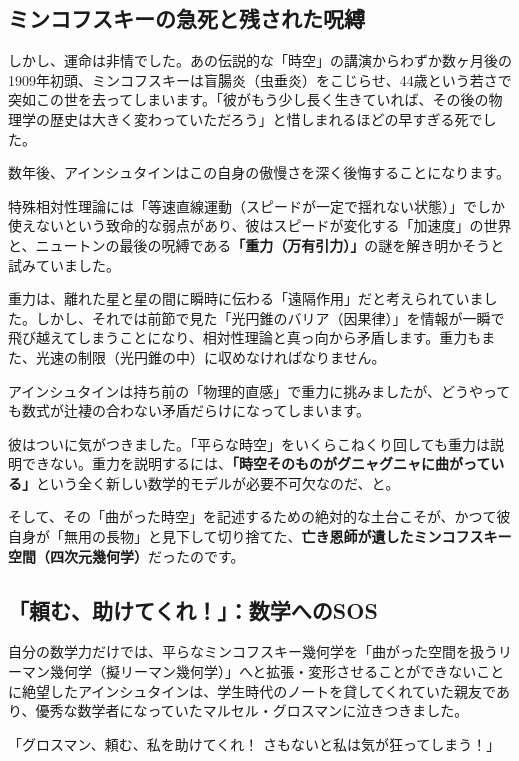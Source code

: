 \subsection{ミンコフスキーの急死と残された呪縛}

しかし、運命は非情でした。あの伝説的な「時空」の講演からわずか数ヶ月後の1909年初頭、ミンコフスキーは盲腸炎（虫垂炎）をこじらせ、44歳という若さで突如この世を去ってしまいます。「彼がもう少し長く生きていれば、その後の物理学の歴史は大きく変わっていただろう」と惜しまれるほどの早すぎる死でした。

数年後、アインシュタインはこの自身の傲慢さを深く後悔することになります。

特殊相対性理論には「等速直線運動（スピードが一定で揺れない状態）」でしか使えないという致命的な弱点があり、彼はスピードが変化する「加速度」の世界と、ニュートンの最後の呪縛である\textbf{「重力（万有引力）」}の謎を解き明かそうと試みていました。

重力は、離れた星と星の間に瞬時に伝わる「遠隔作用」だと考えられていました。しかし、それでは前節で見た「光円錐のバリア（因果律）」を情報が一瞬で飛び越えてしまうことになり、相対性理論と真っ向から矛盾します。重力もまた、光速の制限（光円錐の中）に収めなければなりません。

アインシュタインは持ち前の「物理的直感」で重力に挑みましたが、どうやっても数式が辻褄の合わない矛盾だらけになってしまいます。

彼はついに気がつきました。「平らな時空」をいくらこねくり回しても重力は説明できない。重力を説明するには、\textbf{「時空そのものがグニャグニャに曲がっている」}という全く新しい数学的モデルが必要不可欠なのだ、と。

そして、その「曲がった時空」を記述するための絶対的な土台こそが、かつて彼自身が「無用の長物」と見下して切り捨てた、\textbf{亡き恩師が遺したミンコフスキー空間（四次元幾何学）}だったのです。

\subsection{「頼む、助けてくれ！」：数学へのSOS}

自分の数学力だけでは、平らなミンコフスキー幾何学を「曲がった空間を扱うリーマン幾何学（擬リーマン幾何学）」へと拡張・変形させることができないことに絶望したアインシュタインは、学生時代のノートを貸してくれていた親友であり、優秀な数学者になっていたマルセル・グロスマンに泣きつきました。

「グロスマン、頼む、私を助けてくれ！ さもないと私は気が狂ってしまう！」

